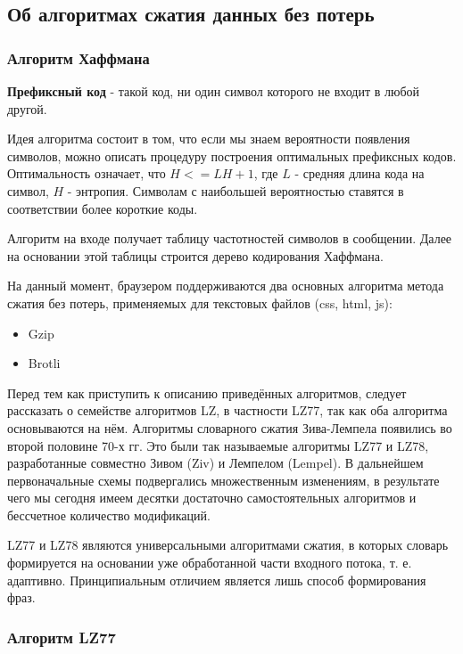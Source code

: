 \documentclass[12pt]{article}
\begin{document}
\subsection{Об алгоритмах сжатия данных без потерь}

\subsubsection{Алгоритм Хаффмана}

\textbf{Префиксный код} - такой код, ни один символ которого не входит в любой другой.

Идея алгоритма состоит в том, что если мы знаем вероятности появления символов,
можно описать процедуру построения оптимальных префиксных кодов. Оптимальность
означает, что $H <= L H + 1$, где $L$ - средняя длина кода на символ, $H$ - энтропия.
Символам с наибольшей вероятностью ставятся в соответствии более короткие коды.

Алгоритм на входе получает таблицу частотностей символов в сообщении.
Далее на основании этой таблицы строится дерево кодирования Хаффмана.

На данный момент, браузером поддерживаются два основных алгоритма метода сжатия без потерь, применяемых для текстовых файлов (css, html, js):

\begin{itemize}
    \item Gzip
    \item Brotli
\end{itemize}

Перед тем как приступить к описанию приведённых алгоритмов, следует рассказать
о семействе алгоритмов LZ, в частности LZ77, так как оба алгоритма основываются на нём.
Алгоритмы словарного сжатия Зива-Лемпела появились во второй половине 70-х гг.
Это были так называемые алгоритмы LZ77 и LZ78, разработанные совместно
Зивом (Ziv) и Лемпелом (Lempel). В дальнейшем первоначальные схемы подвергались множественным
изменениям, в результате чего мы сегодня имеем десятки достаточно самостоятельных алгоритмов
и бессчетное количество модификаций.

LZ77 и LZ78 являются универсальными алгоритмами сжатия,
в которых словарь формируется на основании уже обработанной части входного потока,
т. е. адаптивно. Принципиальным отличием является лишь способ формирования фраз.

\subsubsection{Алгоритм LZ77}
\end{document}
